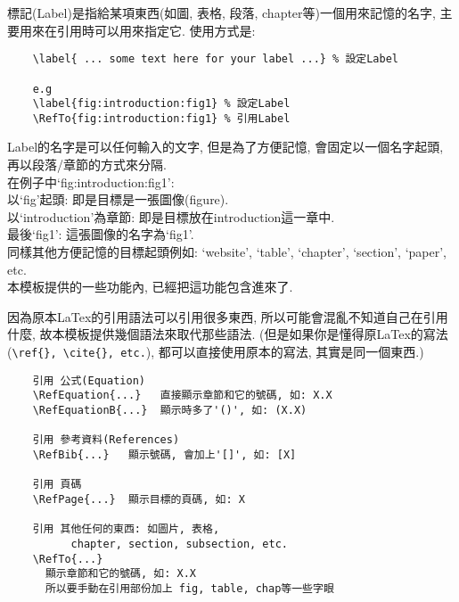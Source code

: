 標記(Label)是指給某項東西(如圖, 表格, 段落, chapter等)一個用來記憶的名字, 主要用來在引用時可以用來指定它. 使用方式是:\\

  \begin{DescriptionFrame}
  \begin{verbatim}
    \label{ ... some text here for your label ...} % 設定Label

    e.g
    \label{fig:introduction:fig1} % 設定Label
    \RefTo{fig:introduction:fig1} % 引用Label
  \end{verbatim}
  \end{DescriptionFrame}

\noindent Label的名字是可以任何輸入的文字, 但是為了方便記憶, 會固定以一個名字起頭, 再以段落/章節的方式來分隔.\\

\noindent 在例子中`fig:introduction:fig1':\\
以`fig'起頭: 即是目標是一張圖像(figure).\\
以`introduction'為章節: 即是目標放在introduction這一章中.\\
最後`fig1': 這張圖像的名字為`fig1'.\\

\noindent 同樣其他方便記憶的目標起頭例如: `website', `table', `chapter', `section', `paper', etc.\\

\noindent 本模板提供的一些功能內, 已經把這功能包含進來了.

\newpage
{}
因為原本LaTex的引用語法可以引用很多東西, 所以可能會混亂不知道自己在引用什麼, 故本模板提供幾個語法來取代那些語法. (但是如果你是懂得原LaTex的寫法(\verb|\ref{}, \cite{}, etc.|), 都可以直接使用原本的寫法, 其實是同一個東西.)\\

  \begin{DescriptionFrame}
  \begin{verbatim}
    引用 公式(Equation)
    \RefEquation{...}   直接顯示章節和它的號碼, 如: X.X
    \RefEquationB{...}  顯示時多了'()', 如: (X.X)

    引用 參考資料(References)
    \RefBib{...}   顯示號碼, 會加上'[]', 如: [X]

    引用 頁碼
    \RefPage{...}  顯示目標的頁碼, 如: X

    引用 其他任何的東西: 如圖片, 表格,
          chapter, section, subsection, etc.
    \RefTo{...}
      顯示章節和它的號碼, 如: X.X
      所以要手動在引用部份加上 fig, table, chap等一些字眼
  \end{verbatim}
  \end{DescriptionFrame}

